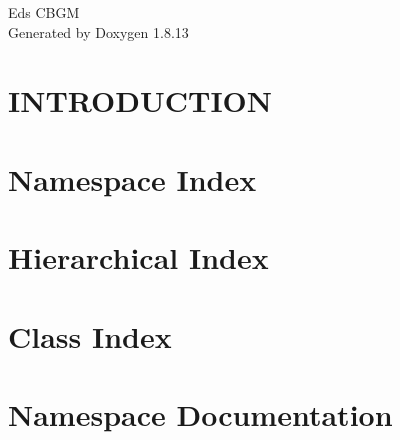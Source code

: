 \documentclass[twoside]{book}
\newcommand{\+}{\discretionary{\mbox{\scriptsize$\hookleftarrow$}}{}{}}
\newcommand{\clearemptydoublepage}{%
  \newpage{\pagestyle{empty}\cleardoublepage}%
}
\begin{document}
\hypersetup{pageanchor=false,
             bookmarksnumbered=true,
             pdfencoding=unicode
            }
\begin{titlepage}
\vspace*{7cm}
\begin{center}%
{\Large Ed\textquotesingle{}s C\+B\+GM }\\
\vspace*{1cm}
{\large Generated by Doxygen 1.8.13}\\
\end{center}
\end{titlepage}
\clearemptydoublepage
{}
\tableofcontents
\clearemptydoublepage
{}
\hypersetup{pageanchor=true}

\chapter{I\+N\+T\+R\+O\+D\+U\+C\+T\+I\+ON}
\label{md_README}

\chapter{Namespace Index}

\chapter{Hierarchical Index}

\chapter{Class Index}

\chapter{Namespace Documentation}






\end{document}
